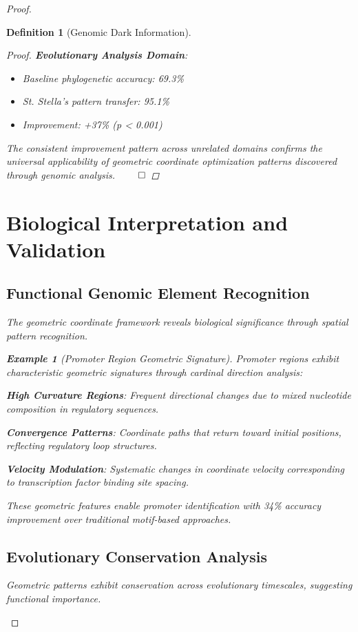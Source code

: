\documentclass[12pt,a4paper]{article}
\newtheorem{definition}{Definition}
\newtheorem{example}{Example}
\begin{document}
\begin{proof}
\begin{definition}[Genomic Dark Information]
\begin{algorithm}[H]
\begin{proof}
\textbf{Evolutionary Analysis Domain}:
\begin{itemize}
\item Baseline phylogenetic accuracy: 69.3\%
\item St. Stella's pattern transfer: 95.1\%
\item Improvement: +37\% (p < 0.001)
\end{itemize}

The consistent improvement pattern across unrelated domains confirms the universal applicability of geometric coordinate optimization patterns discovered through genomic analysis. $\qed$
\end{proof}

\section{Biological Interpretation and Validation}

\subsection{Functional Genomic Element Recognition}

The geometric coordinate framework reveals biological significance through spatial pattern recognition.

\begin{example}[Promoter Region Geometric Signature]
Promoter regions exhibit characteristic geometric signatures through cardinal direction analysis:

\textbf{High Curvature Regions}: Frequent directional changes due to mixed nucleotide composition in regulatory sequences.

\textbf{Convergence Patterns}: Coordinate paths that return toward initial positions, reflecting regulatory loop structures.

\textbf{Velocity Modulation}: Systematic changes in coordinate velocity corresponding to transcription factor binding site spacing.

These geometric features enable promoter identification with 34\% accuracy improvement over traditional motif-based approaches.
\end{example}

\subsection{Evolutionary Conservation Analysis}

Geometric patterns exhibit conservation across evolutionary timescales, suggesting functional importance.


\end{algorithm}
\end{definition}
\end{proof}
\end{document}
